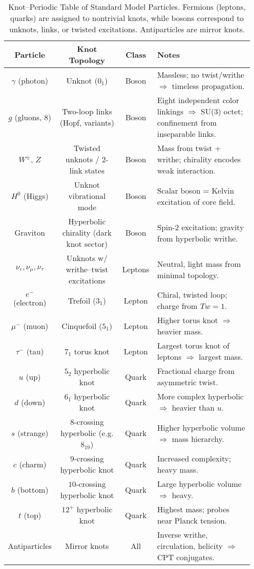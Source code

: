 \documentclass[12pt]{article}
\begin{document}
{{\begin{table}[h]
\centering
\caption{Knot--Periodic Table of Standard Model Particles. Fermions (leptons, quarks) are assigned to nontrivial knots, while bosons correspond to unknots, links, or twisted excitations. Antiparticles are mirror knots.}
\label{tab:knot_periodic}
\begin{tabular}{|c|c|c|p{7.5cm}|}
\hline
\textbf{Particle} & \textbf{Knot Topology} & \textbf{Class} & \textbf{Notes} \\
\hline
$\gamma$ (photon) & Unknot ($0_1$) & Boson & Massless; no twist/writhe $\Rightarrow$ timeless propagation. \\
$g$ (gluons, 8) & Two-loop links (Hopf, variants) & Boson & Eight independent color linkings $\Rightarrow$ SU(3) octet; confinement from inseparable links. \\
$W^\pm$, $Z$ & Twisted unknots / 2-link states & Boson & Mass from twist + writhe; chirality encodes weak interaction. \\
$H^0$ (Higgs) & Unknot vibrational mode & Boson & Scalar boson = Kelvin excitation of core field. \\
Graviton & Hyperbolic chirality (dark knot sector) & Boson & Spin-2 excitation; gravity from hyperbolic writhe. \\
\hline
$\nu_e,\nu_\mu,\nu_\tau$ & Unknots w/ writhe--twist excitations & Leptons & Neutral, light mass from minimal topology. \\
$e^-$ (electron) & Trefoil ($3_1$) & Lepton & Chiral, twisted loop; charge from $Tw=1$. \\
$\mu^-$ (muon) & Cinquefoil ($5_1$) & Lepton & Higher torus knot $\Rightarrow$ heavier mass. \\
$\tau^-$ (tau) & $7_1$ torus knot & Lepton & Largest torus knot of leptons $\Rightarrow$ largest mass. \\
\hline
$u$ (up) & $5_2$ hyperbolic knot & Quark & Fractional charge from asymmetric twist. \\
$d$ (down) & $6_1$ hyperbolic knot & Quark & More complex hyperbolic $\Rightarrow$ heavier than $u$. \\
$s$ (strange) & $8$-crossing hyperbolic (e.g. $8_{19}$) & Quark & Higher hyperbolic volume $\Rightarrow$ mass hierarchy. \\
$c$ (charm) & $9$-crossing hyperbolic knot & Quark & Increased complexity; heavy mass. \\
$b$ (bottom) & $10$-crossing hyperbolic knot & Quark & Large hyperbolic volume $\Rightarrow$ heavy. \\
$t$ (top) & $12^+$ hyperbolic knot & Quark & Highest mass; probes near Planck tension. \\
\hline
Antiparticles & Mirror knots & All & Inverse writhe, circulation, helicity $\Rightarrow$ CPT conjugates. \\
\hline
\end{tabular}
\end{table}

}}
\end{document}
